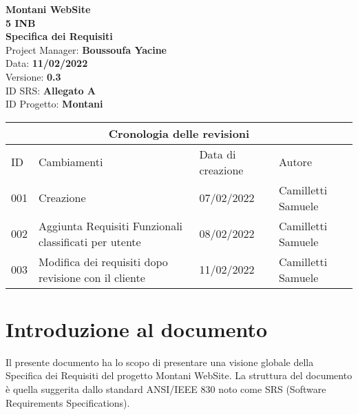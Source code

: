 \documentclass{article}
\begin{document}
	
	
	\begin{titlepage}
		\begin{center}
			\huge\textbf{Montani WebSite}\\
			\Large\textbf{5 INB}\\
			\Large \textbf{Specifica dei Requisiti}\\
			\vspace{4cm}
			\large Project Manager: \textbf{Boussoufa Yacine}\\
			\large Data: \textbf{11/02/2022}\\
			\large Versione: \textbf{0.3}\\
			\large ID SRS: \textbf{Allegato A}\\
			\large ID Progetto: \textbf{Montani}\\
			
		\end{center}
	\end{titlepage}
	
	\clearpage
	
	\begin{tabular}{ |p{1cm}|p{4cm}|p{3cm}|p{2cm}|  }
		\hline
		\multicolumn{4}{|c|}{Cronologia delle revisioni} \\
		\hline
		ID& Cambiamenti &Data di creazione&Autore\\
		\hline
		001   & Creazione    &07/02/2022&   Camilletti Samuele\\
		\hline
		002   & Aggiunta Requisiti Funzionali classificati per utente    &08/02/2022&   Camilletti Samuele\\
		\hline
		003   & Modifica dei requisiti dopo revisione con il cliente    &11/02/2022&   Camilletti Samuele\\
		\hline
	\end{tabular}
	
	\clearpage
	
	\tableofcontents
	\printindex	
	
   

	\section{\textbf{Introduzione al documento}}
	\flushleft
	\normalsize
	Il presente documento ha lo scopo di presentare una visione globale della Specifica dei Requisiti del progetto Montani WebSite. La struttura del documento è quella suggerita dallo standard ANSI/IEEE  830 noto come SRS (Software Requirements Specifications).
	\normalsize
\end{document}
